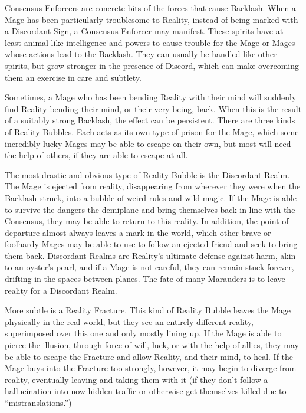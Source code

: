 \documentclass[letterpaper,12pt]{article}
\newcommand{\SECTION}[1]{\vspace{.5em}{\noindent\titlefont\large\textbf{#1}}

}
\begin{document}
\SECTION{Consensus Enforcer}
Consensus Enforcers are concrete bits of the forces that cause
Backlash. When a Mage has been particularly troublesome to Reality,
instead of being marked with a Discordant Sign, a Consensus Enforcer
may manifest. These spirits have at least animal-like intelligence and
powers to cause trouble for the Mage or Mages whose actions lead to
the Backlash. They can usually be handled like other spirits, but grow
stronger in the presence of Discord, which can make overcoming them an
exercise in care and subtlety.

\SECTION{Reality Bubbles}
Sometimes, a Mage who has been bending Reality with their mind will
suddenly find Reality bending their mind, or their very being,
back. When this is the result of a suitably strong Backlash, the
effect can be persistent. There are three kinds of Reality
Bubbles. Each acts as its own type of prison for the Mage, which some
incredibly lucky Mages may be able to escape on their own, but most
will need the help of others, if they are able to escape at all.

The most drastic and obvious type of Reality Bubble is the Discordant
Realm. The Mage is ejected from reality, disappearing from wherever
they were when the Backlash struck, into a bubble of weird rules and
wild magic. If the Mage is able to survive the dangers the demiplane
and bring themselves back in line with the Consensus, they may be able
to return to this reality. In addition, the point of departure almost
always leaves a mark in the world, which other brave or foolhardy
Mages may be able to use to follow an ejected friend and seek to bring
them back. Discordant Realms are Reality's ultimate defense against
harm, akin to an oyster's pearl, and if a Mage is not careful, they
can remain stuck forever, drifting in the spaces between planes. The
fate of many Marauders is to leave reality for a Discordant Realm.

More subtle is a Reality Fracture. This kind of Reality Bubble leaves
the Mage physically in the real world, but they see an entirely
different reality, superimposed over this one and only mostly lining
up. If the Mage is able to pierce the illusion, through force of will,
luck, or with the help of allies, they may be able to escape the
Fracture and allow Reality, and their mind, to heal. If the Mage buys
into the Fracture too strongly, however, it may begin to diverge from
reality, eventually leaving and taking them with it (if they don't
follow a hallucination into now-hidden traffic or otherwise get
themselves killed due to ``mistranslations.'')
\end{document}
